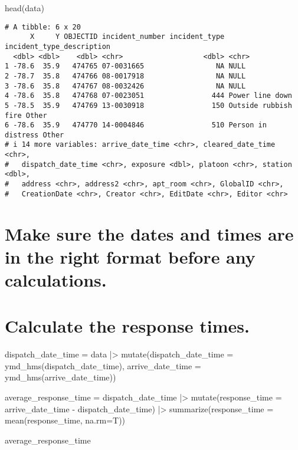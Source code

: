 \documentclass[
  letterpaper,
  DIV=11,
  numbers=noendperiod]{scrartcl}
\newenvironment{Shaded}{\begin{snugshade}}{\end{snugshade}}
\newcommand{\AttributeTok}[1]{\textcolor[rgb]{0.40,0.45,0.13}{#1}}
\newcommand{\FunctionTok}[1]{\textcolor[rgb]{0.28,0.35,0.67}{#1}}
\newcommand{\NormalTok}[1]{\textcolor[rgb]{0.00,0.23,0.31}{#1}}
\newcommand{\OtherTok}[1]{\textcolor[rgb]{0.00,0.23,0.31}{#1}}
\newcommand{\SpecialCharTok}[1]{\textcolor[rgb]{0.37,0.37,0.37}{#1}}
\begin{document}
\begin{Shaded}
\begin{Highlighting}[]
\FunctionTok{head}\NormalTok{(data)}
\end{Highlighting}
\end{Shaded}

\begin{verbatim}
# A tibble: 6 x 20
      X     Y OBJECTID incident_number incident_type incident_type_description 
  <dbl> <dbl>    <dbl> <chr>                   <dbl> <chr>                     
1 -78.6  35.9   474765 07-0031665                 NA NULL                      
2 -78.7  35.8   474766 08-0017918                 NA NULL                      
3 -78.6  35.8   474767 08-0032426                 NA NULL                      
4 -78.6  35.8   474768 07-0023051                444 Power line down           
5 -78.5  35.9   474769 13-0030918                150 Outside rubbish fire Other
6 -78.6  35.9   474770 14-0004846                510 Person in distress Other  
# i 14 more variables: arrive_date_time <chr>, cleared_date_time <chr>,
#   dispatch_date_time <chr>, exposure <dbl>, platoon <chr>, station <dbl>,
#   address <chr>, address2 <chr>, apt_room <chr>, GlobalID <chr>,
#   CreationDate <chr>, Creator <chr>, EditDate <chr>, Editor <chr>
\end{verbatim}

\section{Make sure the dates and times are in the right format before
any
calculations.}\label{make-sure-the-dates-and-times-are-in-the-right-format-before-any-calculations.}

\section{Calculate the response
times.}\label{calculate-the-response-times.}

\begin{Shaded}
\begin{Highlighting}[]
\NormalTok{dispatch\_date\_time }\OtherTok{=}\NormalTok{ data }\SpecialCharTok{|\textgreater{}}
  \FunctionTok{mutate}\NormalTok{(}\AttributeTok{dispatch\_date\_time =} \FunctionTok{ymd\_hms}\NormalTok{(dispatch\_date\_time), }\AttributeTok{arrive\_date\_time =} \FunctionTok{ymd\_hms}\NormalTok{(arrive\_date\_time)) }
  
  
\NormalTok{average\_response\_time }\OtherTok{=}\NormalTok{ dispatch\_date\_time }\SpecialCharTok{|\textgreater{}}
  \FunctionTok{mutate}\NormalTok{(}\AttributeTok{response\_time =}\NormalTok{ arrive\_date\_time }\SpecialCharTok{{-}}\NormalTok{ dispatch\_date\_time) }\SpecialCharTok{|\textgreater{}}
  \FunctionTok{summarize}\NormalTok{(}\AttributeTok{response\_time =} \FunctionTok{mean}\NormalTok{(response\_time, }\AttributeTok{na.rm=}\NormalTok{T)) }
 
\NormalTok{average\_response\_time}
\end{Highlighting}
\end{Shaded}
\end{document}
